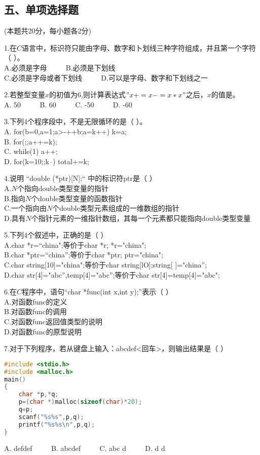 \subsection{五、单项选择题}
(本题共20分，每小题各2分)

1.在$C$语言中，标识符只能由字母、数字和卜划线三种字符组成，并且第一个字符（    ）。 \\
A.必须是字母 $\qquad$ B.必须是下划线 \\
C.必须是字母或者下划线 $\qquad$ D.可以是字母、数字和下划线之一

2.若整型变量$x$的初值为$6$,则计算表达式$"x+=x-=x*x"$之后，$x$的值是。 \\
A. 50 $\qquad$ B. 60 $\qquad$ C. -50 $\qquad$ D. -60

3.下列4个程序段中，不是无限循环的是（    ）。 \\
A. for(b=0,a=1;a>-++b;a=k++) k=a; \\
B. for(;;a++=k); \\
C. while(1) {a++;} \\
D. for(k=10;;k--) total+=k;

4.说明 “double (*ptr)[N];“ 中的标识符ptr是（    ） \\
A.$N$个指向double类型变量的指针 \\
B.指向$N$个double类型变量的函数指针 \\
C.一个指向由$N$个double类型元素组成的一维数组的指针 \\
D.具有$N$个指针元素的一维指针数组，其每一个元素都只能指向double类型变量

5.下列4个叙述中，正确的是（    ） \\
A.char *r=“china";等价于char *r; *r="china"; \\
B.char *ptr=“china”;等价于char *ptr; ptr="china"; \\
C.char string[10]={"china"};等价于char string[lO];string[ ]={"china”}; \\
D.char str[4]="abc”,temp[4]="abc”;等价于char str[4]=temp[4]="abc";

6.在$C$程序中，语句“char *func(int x,int y);”表示（    ） \\
A.对函数func的定义 \\
B.对函数func的调用 \\
C.对函数func返回值类型的说明 \\
D.对函数func的原型说明

7.对于下列程序，若从键盘上输入：abcdef<回车>，则输出结果是（    ）  \\
\begin{lstlisting}[language=cpp]
#include <stdio.h>
#include <malloc.h>
main()
{
    char *p,*q;
    p=(char *)malloc(sizeof(char)*20);
    q=p;
    scanf("%s%s",p,q);
    printf("%s%s\n",p,q);
}
\end{lstlisting}
A. defdef $\qquad$ B. abcdef $\qquad$ C. abc d	$\qquad$ D. d d

